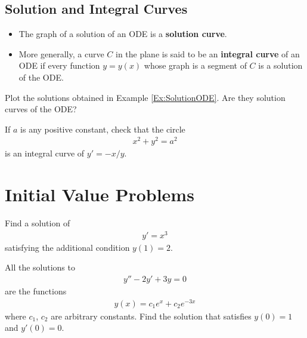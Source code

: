 \documentclass[12pt,a4paper]{article}
\newcounter{example}[section]
\begin{document}
\newpage

\subsection{Solution and Integral Curves}

\begin{itemize}
\item The graph of a solution of an ODE is a \textbf{solution curve}.
\item More generally, a curve $C$ in the plane is said to be an \textbf{integral curve} of an ODE if every function $y = y(x)$ whose graph is a segment of $C$ is a solution of the ODE. 
\end{itemize}

\vspace*{16pt}

\begin{example}
Plot the solutions obtained in Example \ref{Ex:SolutionODE}. Are they solution curves of the ODE?
\end{example}

\vspace*{20pt}

\begin{example}
If $a$ is any positive constant, check that the circle
	\begin{align*}
	x^2 + y^2 = a^2
	\end{align*}
is an integral curve of $y' = -x/y$.
\end{example}

\newpage

\section{Initial Value Problems}

\begin{example}
Find a solution of
	\begin{align*}
	y' = x^3
	\end{align*}
satisfying the additional condition $y(1) = 2$.
\end{example}

\vspace*{6cm}

\begin{example}
All the solutions to
	\begin{align*}
	y'' - 2y' + 3y = 0
	\end{align*}
are the functions
	\begin{align*}
	y (x) = c_1 e^{x} + c_2 e^{-3x} 
	\end{align*}
where $c_1$, $c_2$ are arbitrary constants. Find the solution that satisfies $y(0) = 1$ and $y' (0) = 0$.
\end{example}
\end{document}
